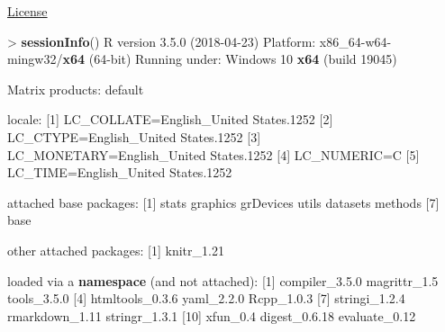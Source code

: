 \documentclass[]{article}
\newenvironment{Shaded}{\begin{snugshade}}{\end{snugshade}}
\newcommand{\KeywordTok}[1]{\textcolor[rgb]{0.13,0.29,0.53}{\textbf{{#1}}}}
\newcommand{\DecValTok}[1]{\textcolor[rgb]{0.00,0.00,0.81}{{#1}}}
\newcommand{\FloatTok}[1]{\textcolor[rgb]{0.00,0.00,0.81}{{#1}}}
\newcommand{\StringTok}[1]{\textcolor[rgb]{0.31,0.60,0.02}{{#1}}}
\newcommand{\NormalTok}[1]{{#1}}
\begin{document}
\href{http://math.wsu.edu/faculty/xchen/stat412/LICENSE.html}{License}

\begin{Shaded}
\begin{Highlighting}[]
\NormalTok{>}\StringTok{ }\KeywordTok{sessionInfo}\NormalTok{()}
\NormalTok{R version }\FloatTok{3.5.0} \NormalTok{(}\DecValTok{2018-04-23}\NormalTok{)}
\NormalTok{Platform:}\StringTok{ }\NormalTok{x86_64-w64-mingw32/}\KeywordTok{x64} \NormalTok{(}\DecValTok{64}\NormalTok{-bit)}
\NormalTok{Running under:}\StringTok{ }\NormalTok{Windows }\DecValTok{10} \KeywordTok{x64} \NormalTok{(build }\DecValTok{19045}\NormalTok{)}

\NormalTok{Matrix products:}\StringTok{ }\NormalTok{default}

\NormalTok{locale:}
\NormalTok{[}\DecValTok{1}\NormalTok{] LC_COLLATE=English_United States}\FloatTok{.1252} 
\NormalTok{[}\DecValTok{2}\NormalTok{] LC_CTYPE=English_United States}\FloatTok{.1252}   
\NormalTok{[}\DecValTok{3}\NormalTok{] LC_MONETARY=English_United States}\FloatTok{.1252}
\NormalTok{[}\DecValTok{4}\NormalTok{] LC_NUMERIC=C                          }
\NormalTok{[}\DecValTok{5}\NormalTok{] LC_TIME=English_United States}\FloatTok{.1252}    

\NormalTok{attached base packages:}
\NormalTok{[}\DecValTok{1}\NormalTok{] stats     graphics  grDevices utils     datasets  methods  }
\NormalTok{[}\DecValTok{7}\NormalTok{] base     }

\NormalTok{other attached packages:}
\NormalTok{[}\DecValTok{1}\NormalTok{] knitr_1}\FloatTok{.21}

\NormalTok{loaded via a }\KeywordTok{namespace} \NormalTok{(and not attached):}
\StringTok{ }\NormalTok{[}\DecValTok{1}\NormalTok{] compiler_3}\FloatTok{.5.0}  \NormalTok{magrittr_1}\FloatTok{.5}    \NormalTok{tools_3}\FloatTok{.5.0}    
 \NormalTok{[}\DecValTok{4}\NormalTok{] htmltools_0}\FloatTok{.3.6} \NormalTok{yaml_2}\FloatTok{.2.0}      \NormalTok{Rcpp_1}\FloatTok{.0.3}     
 \NormalTok{[}\DecValTok{7}\NormalTok{] stringi_1}\FloatTok{.2.4}   \NormalTok{rmarkdown_1}\FloatTok{.11}  \NormalTok{stringr_1}\FloatTok{.3.1}  
\NormalTok{[}\DecValTok{10}\NormalTok{] xfun_0}\FloatTok{.4}        \NormalTok{digest_0}\FloatTok{.6.18}   \NormalTok{evaluate_0}\FloatTok{.12}  
\end{Highlighting}
\end{Shaded}
\end{document}
